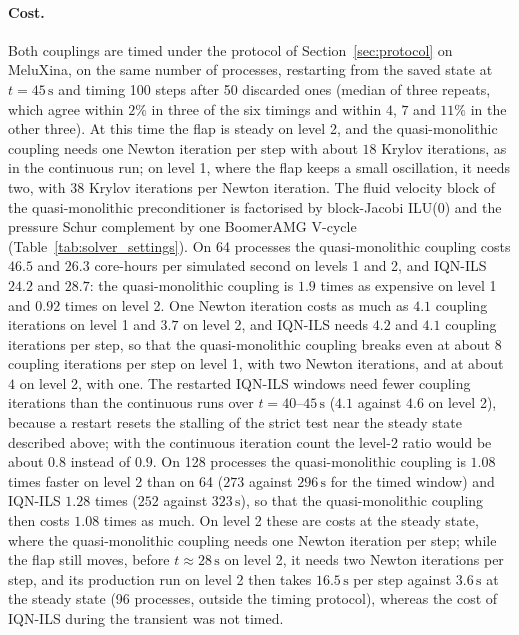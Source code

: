 \paragraph{Cost.}
Both couplings are timed under the protocol of Section~\ref{sec:protocol} on MeluXina, on the same number of processes, restarting from the saved state at $t = 45\,\mathrm{s}$ and timing 100 steps after 50 discarded ones (median of three repeats, which agree within $2\%$ in three of the six timings and within $4$, $7$ and $11\%$ in the other three).
At this time the flap is steady on level 2, and the quasi-monolithic coupling needs one Newton iteration per step with about $18$ Krylov iterations, as in the continuous run; on level 1, where the flap keeps a small oscillation, it needs two, with $38$ Krylov iterations per Newton iteration.
The fluid velocity block of the quasi-monolithic preconditioner is factorised by block-Jacobi ILU(0) and the pressure Schur complement by one BoomerAMG V-cycle (Table~\ref{tab:solver_settings}).
On 64 processes the quasi-monolithic coupling costs $46.5$ and $26.3$ core-hours per simulated second on levels 1 and 2, and IQN-ILS $24.2$ and $28.7$: the quasi-monolithic coupling is $1.9$ times as expensive on level 1 and $0.92$ times on level 2.
One Newton iteration costs as much as $4.1$ coupling iterations on level 1 and $3.7$ on level 2, and IQN-ILS needs $4.2$ and $4.1$ coupling iterations per step, so that the quasi-monolithic coupling breaks even at about $8$ coupling iterations per step on level 1, with two Newton iterations, and at about $4$ on level 2, with one. The restarted IQN-ILS windows need fewer coupling iterations than the continuous runs over $t = 40$--$45\,\mathrm{s}$ ($4.1$ against $4.6$ on level 2), because a restart resets the stalling of the strict test near the steady state described above; with the continuous iteration count the level-2 ratio would be about $0.8$ instead of $0.9$.
On 128 processes the quasi-monolithic coupling is $1.08$ times faster on level 2 than on 64 ($273$ against $296\,\mathrm{s}$ for the timed window) and IQN-ILS $1.28$ times ($252$ against $323\,\mathrm{s}$), so that the quasi-monolithic coupling then costs $1.08$ times as much.
On level 2 these are costs at the steady state, where the quasi-monolithic coupling needs one Newton iteration per step; while the flap still moves, before $t \approx 28\,\mathrm{s}$ on level 2, it needs two Newton iterations per step, and its production run on level 2 then takes $16.5\,\mathrm{s}$ per step against $3.6\,\mathrm{s}$ at the steady state (96 processes, outside the timing protocol), whereas the cost of IQN-ILS during the transient was not timed.

